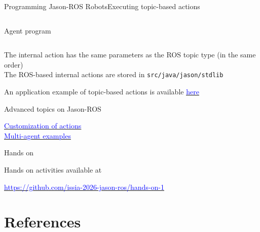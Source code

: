 \documentclass[compress]{beamer}
\newcommand{\link}[2]{\href{#1}{\underline{\textcolor{blue}{#2}}}}
\begin{document}
\begin{frame}[fragile]{Programming Jason-ROS Robots}{Executing topic-based actions}{}
\begin{columns}
\begin{column}{.47\textwidth}
\begin{block}{{\ssmall Agent program}}
\begin{alltt}
\end{alltt}
\end{block}
 \end{column}
\end{columns} 

 {\tiny The internal action has the same parameters as the ROS topic type (in the same order)}\\ 
 
 {\tiny The ROS-based internal actions are stored in \texttt{src/java/jason/stdlib}}
 
 \vfill
 
 {\tiny An application example of topic-based actions is available \link{https://github.com/embedded-mas/jason-ros-course-wesaac2024/tree/main/resources/example_topic_writing_action}{here}}
 
\end{frame}


\begin{frame}{Advanced topics on Jason-ROS}

 \link{https://github.com/embedded-mas/jason-ros-course-wesaac2024/tree/main/resources/example_custom_ia}{
 Customization of actions}\\
 
 \link{https://github.com/embedded-mas/jason-ros-course-wesaac2024/tree/main/resources/example_custom_ia} {Multi-agent examples}
 
\end{frame}


\begin{frame}{Hands on}



 {\scriptsize Hands on activities available at}\\
 
 \vspace{3em}
 
 \link{https://github.com/issia-2026-jason-ros/hands-on-1}{https://github.com/issia-2026-jason-ros/hands-on-1}
\end{frame}



\section{References}
\end{document}
